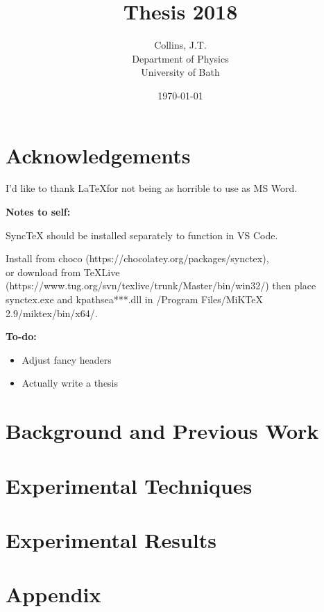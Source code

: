 \documentclass[11pt,a4paper,final]{report}
\title{Thesis 2018}
\author{
	Collins, J.T. \\ 
	Department of Physics\\
	University of Bath\\
}
\date{\today}
\begin{document}
\begin{titlepage}
    
\end{titlepage}

\clearpage
\tableofcontents
\clearpage

\begin{abstract}
    
\end{abstract}
\clearpage


\chapter*{Acknowledgements}
I'd like to thank \LaTeX  for not being as horrible to use as MS Word.

\noindent\textbf{Notes to self:}

\noindent SyncTeX should be installed separately to function in VS Code. 

\noindent Install from choco (https://chocolatey.org/packages/synctex), \\or download from TeXLive (https://www.tug.org/svn/texlive/trunk/Master/bin/win32/) then place synctex.exe and kpathsea***.dll in /Program Files/MiKTeX 2.9/miktex/bin/x64/.


\noindent\textbf{To-do:}
\begin{itemize}
    \item Adjust fancy headers
    \item Actually write a thesis
\end{itemize}


\chapter{Background and Previous Work}\label{sec:background}



\chapter{Experimental Techniques}\label{sec:techniques}





\chapter{Experimental Results}\label{sec:results}








\clearpage

\chapter*{Appendix}\label{sec:appendix}
\appendix

\end{document}
